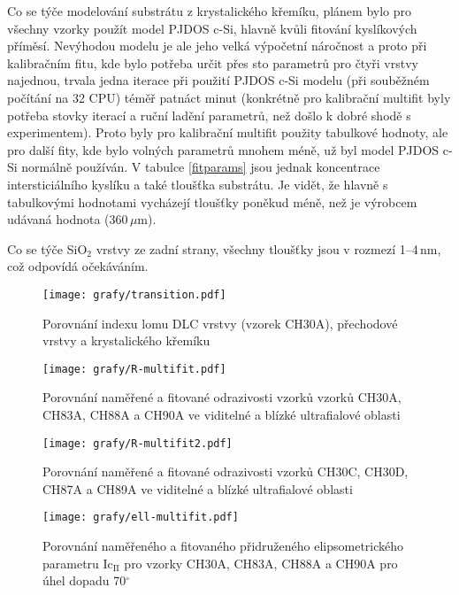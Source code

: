 Co se týče modelování substrátu z krystalického křemíku, plánem bylo pro všechny vzorky použít model PJDOS c-Si, hlavně kvůli fitování kyslíkových příměsí. Nevýhodou modelu je ale jeho velká výpočetní náročnost a proto při kalibračním fitu, kde bylo potřeba určit přes sto parametrů pro čtyři vrstvy najednou, trvala jedna iterace při použití PJDOS c-Si modelu (při souběžném počítání na 32 CPU) téměř patnáct minut (konkrétně pro kalibrační multifit byly potřeba stovky iterací a ruční ladění parametrů, než došlo k dobré shodě s experimentem). Proto byly pro kalibrační multifit použity tabulkové hodnoty, ale pro další fity, kde bylo volných parametrů mnohem méně, už byl model 
PJDOS c-Si normálně používán. V tabulce \ref{fitparams} jsou jednak koncentrace intersticiálního kyslíku a také tloušťka substrátu. Je vidět, že hlavně s tabulkovými hodnotami vycházejí tloušťky poněkud méně, než je výrobcem udávaná hodnota (360\,$\mu$m).

Co se týče SiO$_2$ vrstvy ze zadní strany, všechny tloušťky jsou v rozmezí 1--4\,nm, což odpovídá očekáváním.

\begin{figure}[tbhp]
	\texttt{[image: grafy/transition.pdf]}
	\caption{Porovnání indexu lomu DLC vrstvy (vzorek CH30A), přechodové vrstvy a krystalického křemíku} 
	\label{transition}
\end{figure}

\begin{figure}[ht]
	\texttt{[image: grafy/R-multifit.pdf]}
	\caption{Porovnání naměřené a fitované odrazivosti vzorků vzorků CH30A, CH83A, CH88A a CH90A ve viditelné a blízké ultrafialové oblasti}
	\label{R-multifit}
\end{figure}

\begin{figure}[ht]
	\texttt{[image: grafy/R-multifit2.pdf]}
	\caption{Porovnání naměřené a fitované odrazivosti vzorků CH30C, CH30D, CH87A a CH89A ve viditelné a blízké ultrafialové oblasti}
	\label{R-multifit2}
\end{figure}

\begin{figure}[ht]
	\texttt{[image: grafy/ell-multifit.pdf]}
	\caption{Porovnání naměřeného a fitovaného přidruženého elipsometrického parametru Ic$_{\mathrm{II}}$ pro vzorky CH30A, CH83A, CH88A a CH90A pro úhel dopadu 70$^\circ$}
	\label{ell-multifit}
\end{figure}

